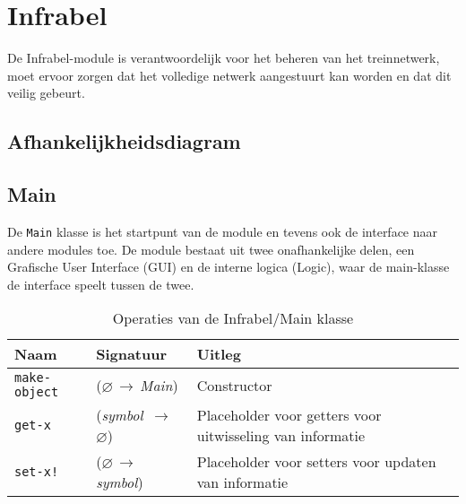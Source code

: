 \documentclass[a4paper, 11pt]{article}
\newcommand{\naar}{\,$\rightarrow$\,}
\renewcommand{\empty}{$\varnothing$}
\newcommand{\<}{\scriptsize\textless\normalsize}
\renewcommand{\>}{\scriptsize\textgreater\normalsize}
\begin{document}
\newpage

\section{Infrabel} %
De Infrabel-module is verantwoordelijk voor het beheren van het treinnetwerk, moet ervoor zorgen dat het volledige netwerk aangestuurt kan worden en dat dit veilig gebeurt.

\subsection{Afhankelijkheidsdiagram} %
\begin{center}
\end{center}

\subsection{Main} %
De \texttt{Main} klasse is het startpunt van de module en tevens ook de interface naar andere modules toe. De module bestaat uit twee onafhankelijke delen, een Grafische User Interface (GUI) en de interne logica (Logic), waar de main-klasse de interface speelt tussen de twee.
\begin{table}[H]
	\begin{center}
		{
		\begin{tabular}{|l l l|}
			\hline
			\textbf{Naam} & \textbf{Signatuur} & \textbf{Uitleg}\\
			\hline
			\texttt{make-object} & (\empty \naar \textit{Main}) & Constructor\\
			\hline
			\texttt{get-x} & (\textit{symbol} \naar \empty) & Placeholder voor getters voor uitwisseling van informatie\\
			\texttt{set-x!} & (\empty \naar \textit{symbol}) & Placeholder voor setters voor updaten van informatie\\
			\hline
		\end{tabular}}
		\caption{Operaties van de Infrabel/Main klasse}
	\end{center}
\end{table}
\end{document}
